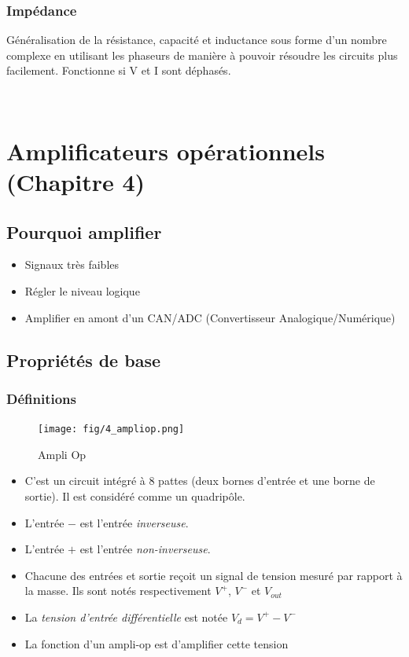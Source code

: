 \documentclass[a4paper]{article}
\begin{document}
        \subsubsection{Impédance}
            Généralisation de la résistance, capacité et inductance sous forme d'un nombre complexe en utilisant les phaseurs de manière à pouvoir résoudre les circuits plus facilement.
            Fonctionne si V et I sont déphasés.

            \




\section{Amplificateurs opérationnels (Chapitre 4)}
    \subsection{Pourquoi amplifier}
        \begin{itemize}
            \item Signaux très faibles
            \item Régler le niveau logique
            \item Amplifier en amont d'un CAN/ADC (Convertisseur Analogique/Numérique)
        \end{itemize}

    \subsection{Propriétés de base}
        \subsubsection{Définitions}
            \begin{figure}[H]
                \begin{center}
                    \texttt{[image: fig/4\_ampliop.png]}
                    \caption{Ampli Op}
                \end{center}
            \end{figure}
            \begin{itemize} 
            \item C'est un circuit intégré à 8 pattes (deux bornes d'entrée et une borne de sortie). Il est considéré comme un quadripôle.
            \item L'entrée $-$ est l'entrée \textit{inverseuse}.
            \item L'entrée $+$ est l'entrée \textit{non-inverseuse}.
            \item Chacune des entrées et sortie reçoit un signal de tension mesuré par rapport à la masse. Ils sont notés respectivement $ V^{+} $, $ V^{-} $ et $ V_{out} $
            \item La \textit{tension d'entrée différentielle} est notée $ V_{d} = V^{+} - V^{-} $
            \item La fonction d'un ampli-op est d'amplifier cette tension
            \end{itemize}
\end{document}
